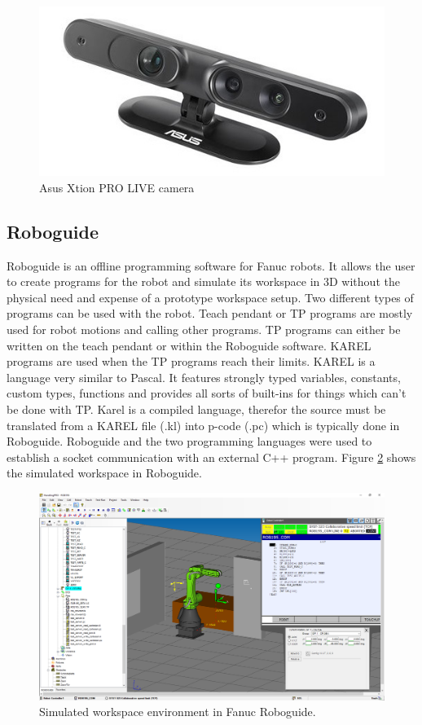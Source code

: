 \begin{figure}[H]
	\centering\includegraphics[scale=0.5]{images/Asus_Xtion_PRO_Live.jpg}			
	\caption{Asus Xtion PRO LIVE camera}
	\label{fig:asus}
\end{figure}



\subsection{Roboguide}
\label{subsec:roboguide}
Roboguide is an offline programming software for Fanuc robots. It allows the user to create programs for the robot and simulate its workspace in 3D without the physical need and expense of a prototype workspace setup. Two different types of programs can be used with the robot. Teach pendant or TP programs are mostly used for robot motions and calling other programs. TP programs can either be written on the teach pendant or within the Roboguide software. KAREL programs are used when the TP programs reach their limits. KAREL is a language very similar to Pascal. It features strongly typed variables, constants, custom types, functions and provides all sorts of built-ins for things which can't be done with TP. Karel is a compiled language, therefor the source must be translated from a KAREL file (.kl) into p-code (.pc) which is typically done in Roboguide. Roboguide and the two programming languages were used to establish a socket communication with an external C++ program. Figure \ref{fig:roboguide} shows the simulated workspace in Roboguide.

\begin{figure}[H]
	\centering\includegraphics[scale=0.3]{images/roboguide.png}			
	\caption{Simulated workspace environment in Fanuc Roboguide.}
	\label{fig:roboguide}
\end{figure}

